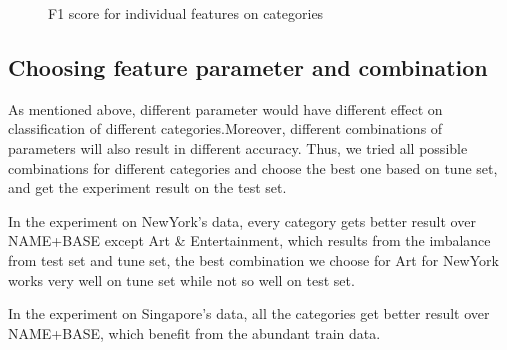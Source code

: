 \begin{figure}[h]
\centering
{}
\caption{F1 score for individual features on categories}
\label{fig:F1FeatureCate}
\end{figure}







\subsection{Choosing feature parameter and combination}
As mentioned above, different parameter would have different effect on classification of different categories.Moreover, different combinations of parameters will also result in different accuracy. Thus, we tried all possible combinations for different categories and choose the best one based on tune set, and get the experiment result on the test set.

In the experiment on NewYork's data, every category gets better result over NAME+BASE except Art \& Entertainment, which results from the imbalance from test set and tune set, the best combination we choose for Art for NewYork works very well on tune set while not so well on test set.

In the experiment on Singapore's data, all the categories get better result over NAME+BASE, which benefit from the abundant train data.

